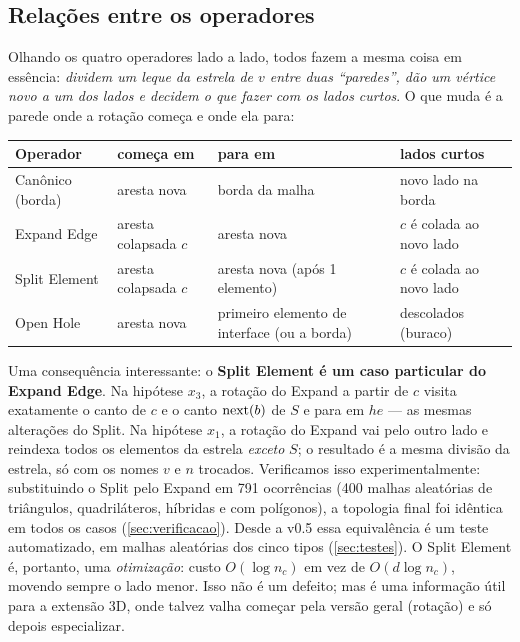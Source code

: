 \subsection{Relações entre os operadores}
\label{sec:relacoes}

Olhando os quatro operadores lado a lado, todos fazem a mesma coisa em essência: \emph{dividem um leque da estrela de $v$
entre duas ``paredes'', dão um vértice novo a um dos lados e decidem o que fazer com os lados curtos}. O que muda é a
parede onde a rotação começa e onde ela para:

\begin{center}\small
\begin{tabular}{llll}
\toprule
Operador & começa em & para em & lados curtos\\
\midrule
Canônico (borda) & aresta nova & borda da malha & novo lado na borda\\
Expand Edge & aresta colapsada $c$ & aresta nova & $c$ é colada ao novo lado\\
Split Element & aresta colapsada $c$ & aresta nova (após 1 elemento) & $c$ é colada ao novo lado\\
Open Hole & aresta nova & primeiro elemento de interface (ou a borda) & descolados (buraco)\\
\bottomrule
\end{tabular}
\end{center}

Uma consequência interessante: o \textbf{Split Element é um caso particular do Expand Edge}. Na hipótese $x_3$, a rotação
do Expand a partir de $c$ visita exatamente o canto de $c$ e o canto $\mathrm{next}(b)$ de $S$ e para em $he$ --- as mesmas
alterações do Split. Na hipótese $x_1$, a rotação do Expand vai pelo outro lado e reindexa todos os elementos da estrela
\emph{exceto} $S$; o resultado é a mesma divisão da estrela, só com os nomes $v$ e $n$ trocados. Verificamos isso
experimentalmente: substituindo o Split pelo Expand em 791 ocorrências (400 malhas aleatórias de triângulos,
quadriláteros, híbridas e com polígonos), a topologia final foi idêntica em todos os casos (\cref{sec:verificacao}).
Desde a v0.5 essa equivalência é um teste automatizado, em malhas aleatórias dos cinco tipos (\cref{sec:testes}). O
Split Element é, portanto, uma \emph{otimização}: custo $O(\log n_c)$ em vez de $O(d\log n_c)$, movendo sempre o lado
menor. Isso não é um defeito; mas é uma informação útil para a extensão 3D,
onde talvez valha começar pela versão geral (rotação) e só depois especializar.

